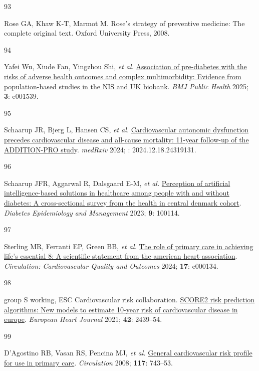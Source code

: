 \documentclass[
  a4paper,
  headsepline=true,
  open=any]{scrbook}
\newlength{\cslhangindent}
\newlength{\csllabelwidth}
\newlength{\cslentryspacingunit} %
\newenvironment{CSLReferences}[2] %
 {%
  \setlength{\parindent}{0pt}
  \ifodd #1
  \let\oldpar\par
  \def\par{\hangindent=\cslhangindent\oldpar}
  \fi
  \setlength{\parskip}{#2\cslentryspacingunit}
 }%
 {}
\newcommand{\CSLLeftMargin}[1]{\parbox[t]{\csllabelwidth}{#1}}
\newcommand{\CSLRightInline}[1]{\parbox[t]{\linewidth - \csllabelwidth}{#1}\break}
\begin{document}
\begin{CSLReferences}{0}{0}
\leavevmode{}%
\CSLLeftMargin{93 }%
\CSLRightInline{Rose GA, Khaw K-T, Marmot M. Rose's strategy of
preventive medicine: The complete original text. Oxford University
Press, 2008.}

\leavevmode{}%
\CSLLeftMargin{94 }%
\CSLRightInline{Yafei Wu, Xiude Fan, Yingzhou Shi, \emph{et al.}
\href{https://doi.org/10.1136/bmjph-2024-001539}{Association of
pre-diabetes with the risks of adverse health outcomes and complex
multimorbidity: Evidence from population-based studies in the NIS and UK
biobank}. \emph{BMJ Public Health} 2025; \textbf{3}: e001539.}

\leavevmode{}%
\CSLLeftMargin{95 }%
\CSLRightInline{Schaarup JR, Bjerg L, Hansen CS, \emph{et al.}
\href{https://doi.org/10.1101/2024.12.18.24319131}{Cardiovascular
autonomic dysfunction precedes cardiovascular disease and all-cause
mortality: 11-year follow-up of the ADDITION-PRO study}. \emph{medRxiv}
2024; : 2024.12.18.24319131.}

\leavevmode{}%
\CSLLeftMargin{96 }%
\CSLRightInline{Schaarup JFR, Aggarwal R, Dalsgaard E-M, \emph{et al.}
\href{https://doi.org/10.1016/j.deman.2022.100114}{Perception of
artificial intelligence-based solutions in healthcare among people with
and without diabetes: A cross-sectional survey from the health in
central denmark cohort}. \emph{Diabetes Epidemiology and Management}
2023; \textbf{9}: 100114.}

\leavevmode{}%
\CSLLeftMargin{97 }%
\CSLRightInline{Sterling MR, Ferranti EP, Green BB, \emph{et al.}
\href{https://doi.org/10.1161/HCQ.0000000000000134}{The role of primary
care in achieving life{'}s essential 8: A scientific statement from the
american heart association}. \emph{Circulation: Cardiovascular Quality
and Outcomes} 2024; \textbf{17}: e000134.}

\leavevmode{}%
\CSLLeftMargin{98 }%
\CSLRightInline{group S working, ESC Cardiovascular risk collaboration.
\href{https://doi.org/10.1093/eurheartj/ehab309}{SCORE2 risk prediction
algorithms: New models to estimate 10-year risk of cardiovascular
disease in europe}. \emph{European Heart Journal} 2021; \textbf{42}:
2439--54.}

\leavevmode{}%
\CSLLeftMargin{99 }%
\CSLRightInline{D'Agostino RB, Vasan RS, Pencina MJ, \emph{et al.}
\href{https://doi.org/10.1161/CIRCULATIONAHA.107.699579}{General
cardiovascular risk profile for use in primary care}. \emph{Circulation}
2008; \textbf{117}: 743--53.}


\end{CSLReferences}
\end{document}
